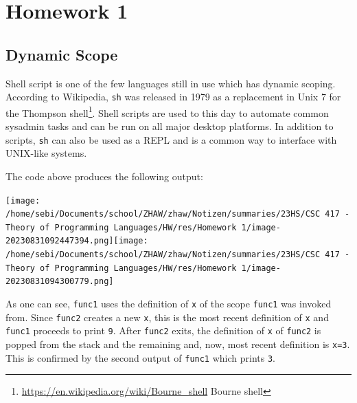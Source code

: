 \documentclass[
]{article}
\author{}
\date{}
\newenvironment{Shaded}{}{}
\newcommand{\BuiltInTok}[1]{\textcolor[rgb]{0.00,0.50,0.00}{#1}}
\newcommand{\CommentTok}[1]{\textcolor[rgb]{0.38,0.63,0.69}{\textit{#1}}}
\newcommand{\ExtensionTok}[1]{#1}
\newcommand{\FunctionTok}[1]{\textcolor[rgb]{0.02,0.16,0.49}{#1}}
\newcommand{\KeywordTok}[1]{\textcolor[rgb]{0.00,0.44,0.13}{\textbf{#1}}}
\newcommand{\NormalTok}[1]{#1}
\newcommand{\OperatorTok}[1]{\textcolor[rgb]{0.40,0.40,0.40}{#1}}
\newcommand{\StringTok}[1]{\textcolor[rgb]{0.25,0.44,0.63}{#1}}
\newcommand{\VariableTok}[1]{\textcolor[rgb]{0.10,0.09,0.49}{#1}}
\begin{document}
\section{Homework 1}\label{homework-1}

\subsection{Dynamic Scope}\label{dynamic-scope}

Shell script is one of the few languages still in use which has dynamic
scoping. According to Wikipedia, \texttt{sh} was released in 1979 as a
replacement in Unix 7 for the Thompson shell\footnote{\url{https://en.wikipedia.org/wiki/Bourne_shell}
  Bourne shell}. Shell scripts are used to this day to automate common
sysadmin tasks and can be run on all major desktop platforms. In
addition to scripts, \texttt{sh} can also be used as a REPL and is a
common way to interface with UNIX-like systems.

\begin{Shaded}
\end{Shaded}

The code above produces the following output:

\texttt{[image: /home/sebi/Documents/school/ZHAW/zhaw/Notizen/summaries/23HS/CSC 417 - Theory of Programming Languages/HW/res/Homework 1/image-20230831092447394.png]}\texttt{[image: /home/sebi/Documents/school/ZHAW/zhaw/Notizen/summaries/23HS/CSC 417 - Theory of Programming Languages/HW/res/Homework 1/image-20230831094300779.png]}

As one can see, \texttt{func1} uses the definition of \texttt{x} of the
scope \texttt{func1} was invoked from. Since \texttt{func2} creates a
new \texttt{x}, this is the most recent definition of \texttt{x} and
\texttt{func1} proceeds to print \texttt{9}. After \texttt{func2} exits,
the definition of \texttt{x} of \texttt{func2} is popped from the stack
and the remaining and, now, most recent definition is \texttt{x=3}. This
is confirmed by the second output of \texttt{func1} which prints
\texttt{3}.
\end{document}
